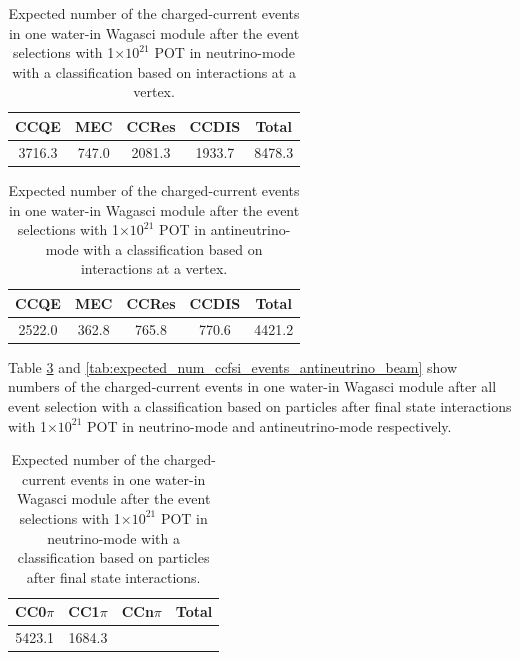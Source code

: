 \begin{table}[htb]
  \begin{center}
    \caption{Expected number of the charged-current events in one water-in Wagasci module after the event selections with 1$\times 10^{21}$ POT in neutrino-mode with a classification based on interactions at a vertex.}
    \begin{tabular}{cccc|c} \hline
CCQE & MEC & CCRes & CCDIS & Total \\ \hline
3716.3 & 747.0 & 2081.3 & 1933.7 & 8478.3 \\
\hline
    \end{tabular}
    \label{tab:expected_num_cc_events_neutrino_beam}
  \end{center}
\end{table}

\begin{table}[htb]
  \begin{center}
    \caption{Expected number of the charged-current events in one water-in Wagasci module after the event selections with 1$\times 10^{21}$ POT in antineutrino-mode with a classification based on interactions at a vertex.}
    \begin{tabular}{cccc|c} \hline
CCQE & MEC & CCRes & CCDIS & Total \\ \hline
2522.0 & 362.8 & 765.8 & 770.6 & 4421.2 \\
\hline
    \end{tabular}
    \label{tab:expected_num_cc_events_antineutrino_beam}
  \end{center}
\end{table}


Table \ref{tab:expected_num_ccfsi_events_neutrino_beam} and \ref{tab:expected_num_ccfsi_events_antineutrino_beam}  show numbers of the charged-current events in one water-in Wagasci module after all event selection with a classification based on particles after final state interactions with 1$\times 10^{21}$ POT in neutrino-mode and antineutrino-mode respectively.

\begin{table}[htb]
  \begin{center}
    \caption{Expected number of the charged-current events in one water-in Wagasci module after the event selections with 1$\times 10^{21}$ POT in neutrino-mode with a classification based on particles after final state interactions.}
    \begin{tabular}{ccc|c} \hline
CC0$\pi$ & CC1$\pi$ & CCn$\pi$  & Total \\ \hline
5423.1 & 1684.3 &  & \\
\hline
    \end{tabular}
    \label{tab:expected_num_ccfsi_events_neutrino_beam}
  \end{center}
\end{table}

